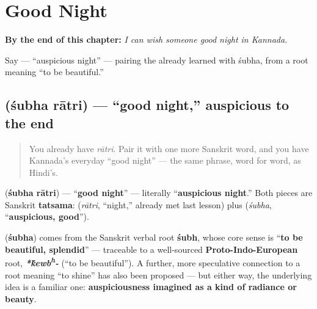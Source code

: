 
\chapter{Good Night}
\label{ch:ka-good-night}

\begin{chapteropening}
\textbf{By the end of this chapter:} \emph{I can wish someone good night in Kannada.}

Say   — \textquotedblleft{}auspicious night\textquotedblright{} — pairing the  already learned with śubha, from a root meaning \textquotedblleft{}to be beautiful.\textquotedblright{}
\end{chapteropening}

\section[\texorpdfstring{\kn{ಶುಭ} \kn{ರಾತ್ರಿ} (śubha rātri)}{ಶುಭ ರಾತ್ರಿ (śubha rātri)}]{  (śubha rātri) — \textquotedblleft{}good night,\textquotedblright{} auspicious to the end}

\label{lesson:KA-C25-shubha-ratri}



\begin{quote}
You already have \emph{rātri}. Pair it with one more Sanskrit word, and you have Kannada's everyday \textquotedblleft{}good night\textquotedblright{} — the same phrase, word for word, as Hindi's.
\end{quote}

\begin{cousinweb}
\textbf{ } (\textbf{śubha rātri}) — \textquotedblleft{}\textbf{good night}\textquotedblright{} — literally \textquotedblleft{}\textbf{auspicious night}.\textquotedblright{} Both pieces are Sanskrit \textbf{tatsama}: \textbf{} (\emph{rātri}, \textquotedblleft{}night,\textquotedblright{} already met last lesson) plus \textbf{} (\emph{śubha}, \textquotedblleft{}\textbf{auspicious, good}\textquotedblright{}).
\end{cousinweb}

\begin{cousinweb}
\textbf{} (\textbf{śubha}) comes from the Sanskrit verbal root \textbf{śubh}, whose core sense is \textquotedblleft{}\textbf{to be beautiful, splendid}\textquotedblright{} — traceable to a well-sourced \textbf{Proto-Indo-European} root, \emph{\textbf{*\'{k}ewb\textsuperscript{h}-}} (\textquotedblleft{}to be beautiful\textquotedblright{}). A further, more speculative connection to a root meaning \textquotedblleft{}to shine\textquotedblright{} has also been proposed — but either way, the underlying idea is a familiar one: \textbf{auspiciousness imagined as a kind of radiance or beauty}.
\end{cousinweb}

